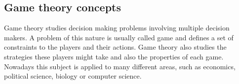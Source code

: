 \subsection{Game theory concepts}

Game theory studies decision making problems involving multiple decision makers.
A problem of this nature is usually called game and defines a set of constraints to the players and their actions.
Game theory also studies the strategies these players might take and also the properties of each game.
Nowadays this subject is applied to many different areas, such as economics, political science, biology or computer science.

